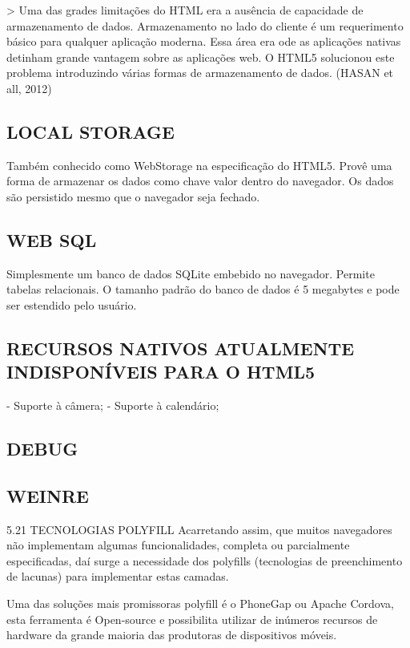 \documentclass[11pt,a4paper]{article}
\begin{document}
> Uma das grades limitações do HTML era a ausência de capacidade
de armazenamento de dados. Armazenamento no lado do cliente é um
requerimento básico para qualquer aplicação moderna. Essa área
era ode as aplicações nativas detinham grande vantagem sobre as
aplicações web. O HTML5 solucionou este problema introduzindo várias
formas de armazenamento de dados. (HASAN et all, 2012)

\subsection{ LOCAL STORAGE}

Também conhecido como WebStorage na especificação do HTML5. Provê
uma forma de armazenar os dados como chave valor dentro do navegador. Os
dados são persistido mesmo que o navegador seja fechado.

\subsection{WEB SQL}

Simplesmente um banco de dados SQLite embebido no navegador. Permite
tabelas relacionais. O tamanho padrão do banco de dados é 5 megabytes
e pode ser estendido pelo usuário.

\subsection{ RECURSOS NATIVOS ATUALMENTE INDISPONÍVEIS PARA O HTML5}

- Suporte à câmera;
- Suporte à calendário;

\subsection{DEBUG}

\subsection{ WEINRE}

 5.21  TECNOLOGIAS POLYFILL
Acarretando assim, que muitos navegadores não implementam algumas
funcionalidades, completa ou parcialmente especificadas, daí surge a
necessidade dos polyfills (tecnologias de preenchimento de lacunas) para
implementar estas camadas.

Uma das soluções mais promissoras polyfill é o PhoneGap ou Apache
Cordova, esta ferramenta é Open-source e possibilita utilizar de
inúmeros recursos de hardware da grande maioria das produtoras de
dispositivos móveis.
\end{document}
